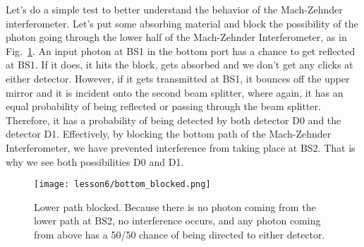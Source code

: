 Let's do a simple test to better understand the behavior of the Mach-Zehnder interferometer.
Let's put some absorbing material and block the possibility of the photon going through the lower half of the Mach-Zehnder Interferometer, as in Fig.~\ref{fig:m-z-blocked}.
An input photon at BS1 in the bottom port has a chance to get reflected at BS1.
If it does, it hits the block, gets absorbed and we don't get any clicks at either detector.
However, if it gets transmitted at BS1, it bounces off the upper mirror and it is incident onto the second beam splitter, where again, it has an equal probability of being reflected or passing through the beam splitter.
Therefore, it has a probability of being detected by both detector D0 and the detector D1.
Effectively, by blocking the bottom path of the Mach-Zehnder Interferometer, we have prevented interference from taking place at BS2.
That is why we see both possibilities D0 and D1.
\begin{figure}[t]
   \centering
    \texttt{[image: lesson6/bottom\_blocked.png]}
    \caption[Lower path blocked.]{Lower path blocked. Because there is no photon coming from the lower path at BS2, no interference occurs, and any photon coming from above has a 50/50 chance of being directed to either detector.}
    \label{fig:m-z-blocked}
\end{figure}



